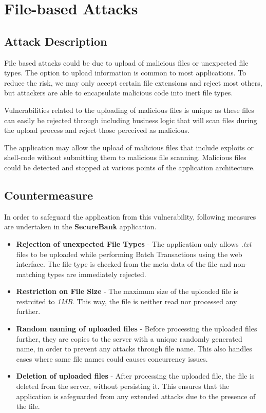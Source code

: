 \section{File-based Attacks}

\subsection{Attack Description}
File based attacks could be due to upload of malicious files or unexpected file types. The option to upload information is common to most applications. To reduce the risk, we may only accept certain file extensions and reject most others, but attackers are able to encapsulate malicious code into inert file types.

Vulnerabilities related to the uploading of malicious files is unique as these files can easily be rejected through including business logic that will scan files during the upload process and reject those perceived as malicious. 

The application may allow the upload of malicious files that include exploits or shell-code without submitting them to malicious file scanning. Malicious files could be detected and stopped at various points of the application architecture.

\subsection{Countermeasure}
In order to safeguard the application from this vulnerability, following measures are undertaken in the \textbf{SecureBank} application.
\begin{itemize}
\item \textbf{Rejection of unexpected File Types} - The application only allows \textit{.txt} files to be uploaded while performing Batch Transactions using the web interface. The file type is checked from the meta-data of the file and non-matching types are immediately rejected.
\item \textbf{Restriction on File Size} - The maximum size of the uploaded file is restrcited to \textit{1MB}. This way, the file is neither read nor processed any further. 
\item \textbf{Random naming of uploaded files} - Before processing the uploaded files further, they are copies to the server with a unique randomly generated name, in order to prevent any attacks through file name. This also handles cases where same file names could causes concurrency issues.
\item \textbf{Deletion of uploaded files} - After processing the uploaded file, the file is deleted from the server, without persisting it. This ensures that the application is safeguarded from any extended attacks due to the presence of the file.
\end{itemize}

\clearpage